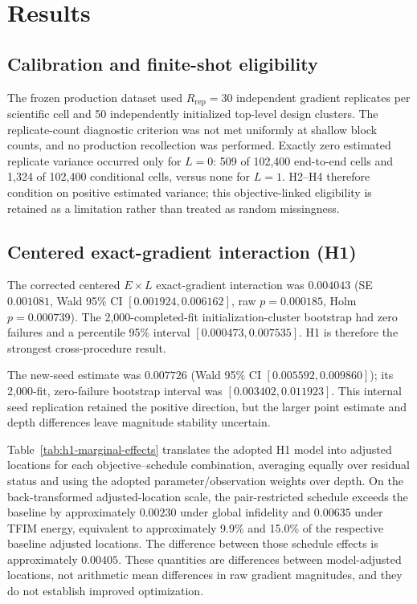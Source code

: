 \documentclass[pdflatex,sn-mathphys-num,Numbered]{sn-jnl}
\begin{document}
\section{Results}

\subsection{Calibration and finite-shot eligibility}\label{sec:results-calibration}\label{sec:zero-variance-sensitivity}

The frozen production dataset used $R_{\mathrm{rep}}=30$ independent gradient replicates per scientific cell and 50 independently initialized top-level design clusters. The replicate-count diagnostic criterion was not met uniformly at shallow block counts, and no production recollection was performed. Exactly zero estimated replicate variance occurred only for $L=0$: 509 of 102,400 end-to-end cells and 1,324 of 102,400 conditional cells, versus none for $L=1$. H2--H4 therefore condition on positive estimated variance; this objective-linked eligibility is retained as a limitation rather than treated as random missingness.

\subsection{Centered exact-gradient interaction (H1)}\label{sec:h1-result}

The corrected centered $E\times L$ exact-gradient interaction was $0.004043$ (SE $0.001081$, Wald 95\% CI $[0.001924,0.006162]$, raw $p=0.000185$, Holm $p=0.000739$). The 2,000-completed-fit initialization-cluster bootstrap had zero failures and a percentile 95\% interval $[0.000473,0.007535]$. H1 is therefore the strongest cross-procedure result.

The new-seed estimate was $0.007726$ (Wald 95\% CI $[0.005592,0.009860]$); its 2,000-fit, zero-failure bootstrap interval was $[0.003402,0.011923]$. This internal seed replication retained the positive direction, but the larger point estimate and depth differences leave magnitude stability uncertain.

Table~\ref{tab:h1-marginal-effects} translates the adopted H1 model into adjusted locations for each objective--schedule combination, averaging equally over residual status and using the adopted parameter/observation weights over depth. On the back-transformed adjusted-location scale, the pair-restricted schedule exceeds the baseline by approximately $0.00230$ under global infidelity and $0.00635$ under TFIM energy, equivalent to approximately 9.9\% and 15.0\% of the respective baseline adjusted locations. The difference between those schedule effects is approximately $0.00405$. These quantities are differences between model-adjusted locations, not arithmetic mean differences in raw gradient magnitudes, and they do not establish improved optimization.
\end{document}
